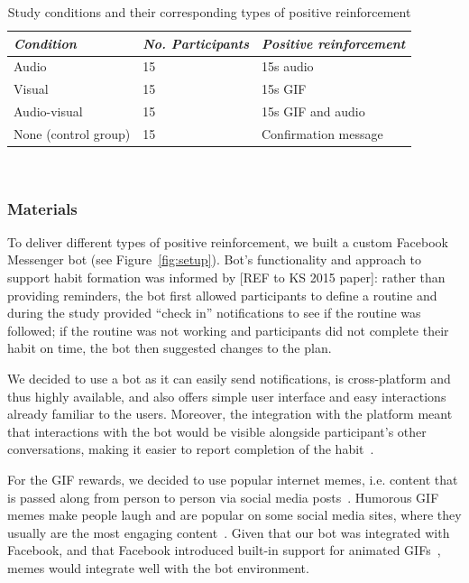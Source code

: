 \documentclass{scaffold/sigchi}
\begin{document}
\begin{table}
  \centering
  \begin{tabular}{l l l}
    {\small\textit{Condition}} & {\small \textit{No. Participants}} & {\small \textit{Positive reinforcement}} \\
    \midrule
    Audio & 15 & 15s audio\\
    Visual & 15 & 15s GIF \\
    Audio-visual & 15 & 15s GIF and audio \\
    None (control group) & 15 & Confirmation message \\
  \end{tabular}
  \caption{Study conditions and their corresponding types of positive reinforcement}~\label{fig:precise_rewards}
\end{table}

\subsubsection{Materials}
To deliver different types of positive reinforcement, we built a custom Facebook Messenger bot (see Figure~\ref{fig:setup}). Bot's functionality and approach to support habit formation was informed by [REF to KS 2015 paper]: rather than providing reminders, the bot first allowed participants to define a routine and during the study provided ``check in'' notifications to see if the routine was followed; if the routine was not working and participants did not complete their habit on time, the bot then suggested changes to the plan.

We decided to use a bot as it can easily send notifications, is cross-platform and thus highly available, and also offers simple user interface and easy interactions already familiar to the users. Moreover, the integration with the platform meant that interactions with the bot would be visible alongside participant's other conversations, making it easier to report completion of the habit~\cite{the_power_of_logging_mobile_notifications}.

For the GIF rewards, we decided to use popular internet memes, i.e. content that is passed along from person to person via social media posts~\cite{meme_definition}. Humorous GIF memes make people laugh and are popular on some social media sites, where they usually are the most engaging content~\cite{meme_gifs_are_good}. Given that our bot was integrated with Facebook, and that Facebook introduced built-in support for animated GIFs~\cite{fb_gif_rollout}, memes would integrate well with the bot environment. 
\end{document}
